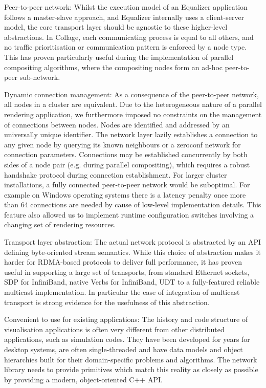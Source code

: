 \begin{compactdesc}

\item[Peer-to-peer network:] Whilst the execution model of an Equalizer
application follows a master-slave approach, and Equalizer internally uses a
client-server model, the core transport layer should be agnostic to these
higher-level abstractions. In Collage, each communicating process is equal to
all others, and no traffic prioritisation or communication pattern is enforced
by a node type. This has proven particularly useful during the implementation of
parallel compositing algorithms, where the compositing nodes form an ad-hoc
peer-to-peer sub-network.

\item[Dynamic connection management:] As a consequence of the peer-to-peer
network, all nodes in a cluster are equivalent. Due to the heterogeneous nature
of a parallel rendering application, we furthermore imposed no constraints on
the management of connections between nodes. Nodes are identified and addressed
by an universally unique identifier. The network layer lazily establishes a
connection to any given node by querying its known neighbours or a zeroconf
network for connection parameters. Connections may be established concurrently
by both sides of a node pair (e.g. during parallel compositing), which requires
a robust handshake protocol during connection establishment. For larger cluster
installations, a fully connected peer-to-peer network would be suboptimal. For
example on Windows operating systems there is a latency penalty once more than
64 connections are needed by cause of low-level implementation details. This feature
also allowed us to implement runtime configuration switches involving a
changing set of rendering resources.

\item[Transport layer abstraction:] The actual network protocol is abstracted
by an API defining byte-oriented stream semantics. While this choice of
abstraction makes it harder for RDMA-based protocols to deliver full
performance, it has proven useful in supporting a large set of transports, from
standard Ethernet sockets, SDP for InfiniBand, native Verbs for InfiniBand, UDT
to a fully-featured reliable multicast implementation. In particular the ease
of integration of multicast transport is strong evidence for the usefulness of
this abstraction.

\item[Convenient to use for existing applications:] The history and code
structure of visualisation applications is often very different from other
distributed applications, such as simulation codes. They have been developed for
years for desktop systems, are often single-threaded and have data models and
object hierarchies built for their domain-specific problems and algorithms. The
network library needs to provide primitives which match this reality as closely
as possible by providing a modern, object-oriented C++ API.

\end{compactdesc}


